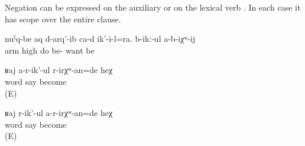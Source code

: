 Negation can be expressed on the auxiliary  or on the lexical verb . In each case it has scope over the entire clause.
%
\begin{exe}
	\ex	\label{ex:He also raised his arms; he probably does not want to (be taken away)}
	\gll	nuˁq-be	aq d-arq'-ib ca-d	ik'-i-l=ra.	b-ikː-ul		a-b-iχʷ-ij\\
		arm	high do be-		want	be\\
	\glt	{}

	\ex	\label{ex:‎Probably she was not scolding reprise}
	\begin{xlist}
		\ex	\label{ex:‎Probably she was not scolding@A}
		\gll	ʁaj	a-r-ik'-ul	r-irχʷ-an=de	heχ\\
			word	say	become	\\
		\glt	{} (E)
	
		\ex	\label{ex:‎Probably she was not scolding@B}
		\gll	ʁaj	r-ik'-ul	a-r-irχʷ-an=de	heχ\\
			word	say	become	\\
		\glt	{} (E)
	\end{xlist}
\end{exe}


